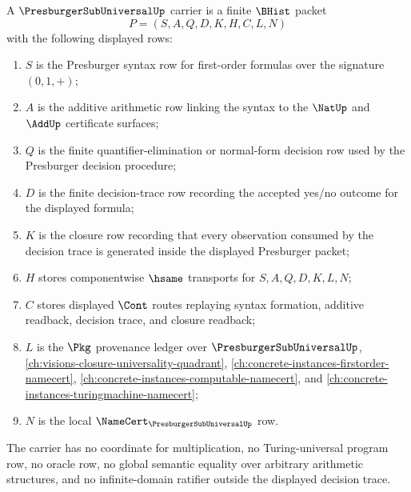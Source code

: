 \begin{definition}
\label{def:presburger-subuniversal-carrier}
A $\PresburgerSubUniversalUp$ carrier is a finite $\BHist$ packet
$$
P=(S,A,Q,D,K,H,C,L,N)
$$
with the following displayed rows:
\begin{enumerate}
\item $S$ is the Presburger syntax row for first-order formulas over the signature $(0,1,+)$;
\item $A$ is the additive arithmetic row linking the syntax to the $\NatUp$ and $\AddUp$ certificate surfaces;
\item $Q$ is the finite quantifier-elimination or normal-form decision row used by the Presburger decision procedure;
\item $D$ is the finite decision-trace row recording the accepted yes/no outcome for the displayed formula;
\item $K$ is the closure row recording that every observation consumed by the decision trace is generated inside the displayed Presburger packet;
\item $H$ stores componentwise $\hsame$ transports for $S,A,Q,D,K,L,N$;
\item $C$ stores displayed $\Cont$ routes replaying syntax formation, additive readback, decision trace, and closure readback;
\item $L$ is the $\Pkg$ provenance ledger over $\PresburgerSubUniversalUp$, \autoref{ch:visions-closure-universality-quadrant}, \autoref{ch:concrete-instances-firstorder-namecert}, \autoref{ch:concrete-instances-computable-namecert}, and \autoref{ch:concrete-instances-turingmachine-namecert};
\item $N$ is the local $\NameCert_{\PresburgerSubUniversalUp}$ row.
\end{enumerate}
The carrier has no coordinate for multiplication, no Turing-universal program row, no oracle row, no global semantic equality over arbitrary arithmetic structures, and no infinite-domain ratifier outside the displayed decision trace.
\end{definition}


